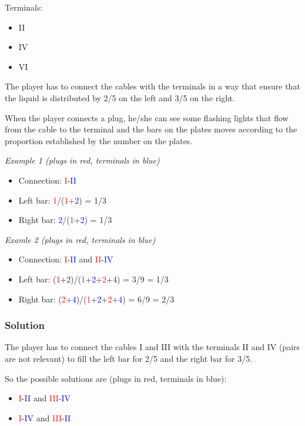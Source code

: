 Terminals:
\begin{itemize}
	\item II
	\item IV
	\item VI
\end{itemize}

The player has to connect the cables with the terminals in a way that ensure that the liquid is distributed by 2/5 on the left and 3/5 on the right.

When the player connects a plug, he/she can see some flashing lights that flow from the cable to the terminal and the bars on the plates moves according to the proportion established by the number on the plates.

\textit{Example 1 (plugs in red, terminals in blue)}
\begin{itemize}
	\item Connection: \textcolor{red}{I}-\textcolor{blue}{II}
	\item Left bar: \textcolor{red}{1}/(\textcolor{red}{1}+\textcolor{blue}{2}) = 1/3
	\item Right bar: \textcolor{blue}{2}/(\textcolor{red}{1}+\textcolor{blue}{2}) = 1/3
\end{itemize}

\textit{Examle 2 (plugs in red, terminals in blue)}
\begin{itemize}
	\item Connection: \textcolor{red}{I}-\textcolor{blue}{II} and \textcolor{red}{II}-\textcolor{blue}{IV}
	\item Left bar: (\textcolor{red}{1}+\textcolor{blue}{2})/(\textcolor{red}{1}+\textcolor{blue}{2}+\textcolor{red}{2}+\textcolor{blue}{4}) = 3/9 = 1/3
	\item Right bar: (\textcolor{red}{2}+\textcolor{blue}{4})/(\textcolor{red}{1}+\textcolor{blue}{2}+\textcolor{red}{2}+\textcolor{blue}{4}) = 6/9 = 2/3
\end{itemize}

\subsubsection*{Solution}
The player has to connect the cables I and III with the terminals II and IV (pairs are not relevant) to fill the left bar for 2/5 and the right bar for 3/5.

So the possible solutions are (plugs in red, terminals in blue):
\begin{itemize}
	\item \textcolor{red}{I}-\textcolor{blue}{II} and \textcolor{red}{III}-\textcolor{blue}{IV}
	\item \textcolor{red}{I}-\textcolor{blue}{IV} and \textcolor{red}{III}-\textcolor{blue}{II}
\end{itemize}

